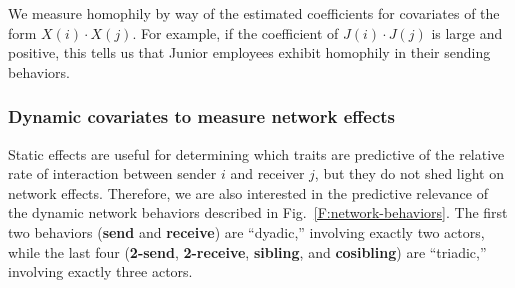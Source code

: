\documentclass[final]{statsoc}
\begin{document}
We measure homophily by way of the estimated coefficients for covariates of the form
$X(i) \cdot X(j)$.  For example, if the coefficient of $J(i) \cdot J(j)$ is
large and positive, this tells us that Junior employees exhibit homophily in
their sending behaviors.


\subsubsection{Dynamic covariates to measure network effects}

Static effects are useful for determining which traits are predictive of the
relative rate of interaction between sender $i$ and receiver $j$, but they do
not shed light on network effects.  Therefore, we are also interested in the predictive
relevance of the dynamic network behaviors described in
Fig.~\ref{F:network-behaviors}.  The first two behaviors (\textbf{send} and
\textbf{receive}) are ``dyadic,'' involving exactly two actors, while the last
four (\textbf{2-send}, \textbf{2-receive}, \textbf{sibling}, and
\textbf{cosibling}) are ``triadic,'' involving exactly three actors.
\end{document}
